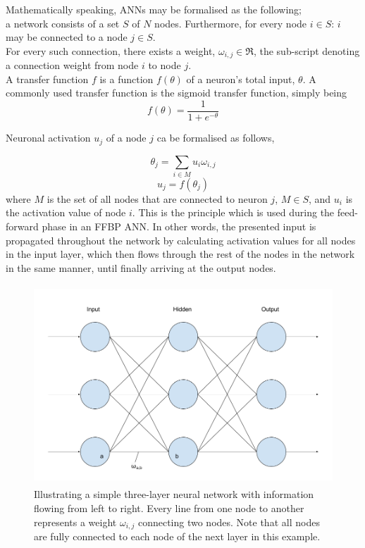 Mathematically speaking, ANNs may be formalised as the following;
\\
a network consists of a set $S$ of $N$ nodes. Furthermore, for every node $i\in S$: $i$ may be connected to a node $j \in S$.
\\
For every such connection, there exists a weight, $\omega_{i,j} \in \Re$, the sub-script denoting a connection weight from node $i$ to node $j$.
\\
A transfer function $f$ is a function $f(\theta)$ of a neuron's total input, $\theta$. A commonly used transfer function is the sigmoid transfer function, simply being 
\begin{equation}\label{sigmoid}
    f(\theta) = \frac{1}{1+e^{-\theta}}
\end{equation}

Neuronal activation $u_j$ of a node $j$ ca be formalised as follows,

\begin{equation}\label{input}
    \theta_j = \sum_{i\in M} u_i \omega_{i,j}
\end{equation}
\begin{equation}\label{activation}
    u_j = f(\theta_j)
\end{equation}
where $M$ is the set of all nodes that are connected to neuron $j$, $M \in S$, and $u_i$ is the activation value of node $i$. This is the principle which is used during the feed-forward phase in an FFBP ANN. In other words, the presented input is propagated throughout the network by calculating activation values for all nodes in the input layer, which then flows through the rest of the nodes in the network in the same manner, until finally arriving at the output nodes.

\begin{figure}
\centering
\includegraphics[width=12cm, height=7.5cm]{fig/three_layers_weight}
\caption{Illustrating a simple three-layer neural network with information flowing from left to right. Every line from one node to another represents a weight $\omega_{i,j}$ connecting two nodes. Note that all nodes are fully connected to each node of the next layer in this example.}
\label{fig:three_layer_ann}
\end{figure}


